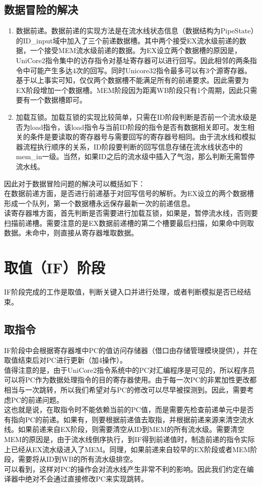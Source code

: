 \documentclass[12pt,a4paper,Flow]{report}
\begin{document}
\subsection{数据冒险的解决}
\begin{enumerate}
\item 数据前递。数据前递的实现方法是在流水线状态信息（数据结构为PipeState）的ID\_input域中加入了三个前递数据槽。其中两个接受EX流水级前递的数据，一个接受MEM流水级前递的数据。为EX设立两个数据槽的原因是，UniCore2指令集中的访存指令对基址寄存器可以进行回写。因此相邻的两条指令中可能产生多达4次的回写。同时Unicore32指令最多可以有3个源寄存器。基于以上事实可知，仅仅两个数据槽不能满足所有的前递要求。因此需要为EX阶段增加一个数据槽。MEM阶段因为距离WB阶段只有1个周期，因此只需要有一个数据槽即可。
\item 加载互锁。加载互锁的实现比较简单，只需在ID阶段判断是否前一个流水级是否为load指令，该load指令与当前ID阶段的指令是否有数据相关即可。发生相关的条件是要读取的寄存器号与需要回写的寄存器号相同。由于流水线和模拟器流程执行顺序的关系，ID阶段要判断的回写信息存储在流水线状态中的mem\_in一级。当然，如果ID之后的流水级中插入了气泡，那么判断无需暂停流水线。
\end{enumerate}
\indent 因此对于数据冒险问题的解决可以概括如下：\\
\indent 在数据前递方面，是否进行前递基于对回写信号的解析。为EX设立的两个数据槽形成一个队列，第一个数据槽永远保存最新一次的前递信息。\\
\indent 读寄存器堆方面，首先判断是否需要进行加载互锁，如果是，暂停流水线，否则要扫描前递槽。需要注意的是EX数据前递槽的第二个槽要最后扫描，如果命中则取数据。未命中，则直接从寄存器堆取数据。
\section{取值（IF）阶段}
IF阶段完成的工作是取值，判断关键入口并进行处理，或者判断模拟是否已经结束。
\subsection{取指令}
IF阶段中会根据寄存器堆中PC的值访问存储器（借口由存储管理模块提供），并在取值结束后对PC进行更新（加4操作）。\\
\indent 值得注意的是，由于UniCore2指令系统中的PC对汇编程序是可见的，所以程序员可以将PC作为数据处理指令的目的寄存器使用。由于每一次PC的非累加性更改都相当与一次跳转，所以我们希望对与PC的修改可以尽早被探测到。因此，需要考虑PC的前递问题。\\
\indent 这也就是说，在取指令时不能依赖当前的PC值，而是需要先检查前递单元中是否有指向PC的前递。如果有，则要根据前递值去取指，并根据前递来源来清空流水线。如果前递来自EX阶段，则需要清空从ID到MEM的所有流水级。需要清空MEM的原因是，由于流水线倒序执行，到IF得到前递值时，制造前递的指令实际上已经从EX流水级进入了MEM。同理，如果前递来自较早的EX阶段或者MEM阶段，需要将从ID到WB的所有流水级排空。\\
\indent 可以看到，这样对PC的操作会对流水线产生非常不利的影响。因此我们约定在编译器中绝对不会通过直接修改PC来实现跳转。
\end{document}
